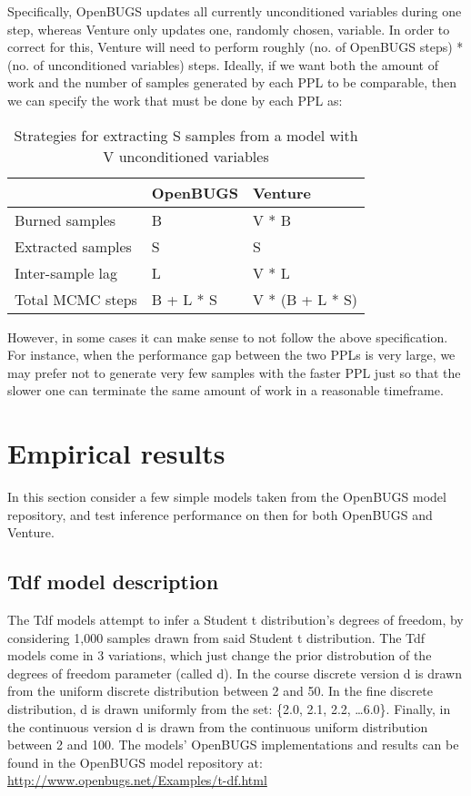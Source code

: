 Specifically, OpenBUGS updates all currently unconditioned variables during one step, whereas Venture only updates one, randomly chosen, variable. In order to correct for this, Venture will need to perform roughly (no. of OpenBUGS steps) * (no. of unconditioned variables) steps. Ideally, if we want both the amount of work and the number of samples generated by each PPL to be comparable, then we can specify the work that must be done by each PPL as:

\begin{table}[H]
  \centering
  \begin{tabular}{lll}
    \toprule
    & OpenBUGS & Venture \\
    \midrule
    Burned samples & B & V * B \\
    Extracted samples & S & S \\
    Inter-sample lag & L & V * L \\
    Total MCMC steps & B + L * S & V * (B + L * S) \\
    \bottomrule
  \end{tabular}
  \caption{Strategies for extracting S samples from a model with V unconditioned variables}
  \label{tab:noSteps}
\end{table}

However, in some cases it can make sense to not follow the above specification. For instance, when the performance gap between the two PPLs is very large, we may prefer not to generate very few samples with the faster PPL just so that the slower one can terminate the same amount of work in a reasonable timeframe. 

\section{Empirical results}
In this section consider a few simple models taken from the OpenBUGS model repository, and test inference performance on then for both OpenBUGS and Venture. 

\subsection{Tdf model description}
The Tdf models attempt to infer a Student t distribution's degrees of freedom, by considering 1,000 samples drawn from said Student t distribution. The Tdf models come in 3 variations, which just change the prior distrobution of the degrees of freedom parameter (called d). In the course discrete version d is drawn from the uniform discrete distribution between 2 and 50. In the fine discrete distribution, d is drawn uniformly from the set: \{2.0, 2.1, 2.2, \ldots 6.0\}. Finally, in the continuous version d is drawn from the continuous uniform distribution between 2 and 100. The models' OpenBUGS implementations and results can be found in the OpenBUGS model repository at: \url{http://www.openbugs.net/Examples/t-df.html}

